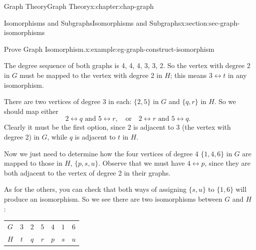 \documentclass[oneside,10pt,]{book}
\newcommand{\tabularfont}{\relax}
\numberwithin{equation}{section}
\newcommand{\hrulemedium}{\noalign{\hrule height 0.07em}}
\begin{document}
\begin{chapterptx}{Graph Theory}{}{Graph Theory}{}{}{x:chapter:chap-graph}
\begin{sectionptx}{Isomorphisms and Subgraphs}{}{Isomorphisms and Subgraphs}{}{}{x:section:sec-graph-isomorphisms}
\begin{example}{Prove Graph Isomorphism.}{x:example:eg-graph-construct-isomorphism}
\begin{sidebyside}{2}{0.22}{0.22}{0.16}
\begin{sbspanel}{0.2}
{
}%
\end{sbspanel}%
\end{sidebyside}%
\par
The degree sequence of both graphs is 4, 4, 4, 3, 3, 2. So the vertex with degree 2 in \(G\) must be mapped to the vertex with degree 2 in \(H\); this means \(3 \leftrightarrow t\) in any isomorphism.%
\par
There are two vertices of degree 3 in each: \(\{2,5\}\) in \(G\) and \(\{q,r\}\) in \(H\). So we should map either%
\begin{equation*}
2 \leftrightarrow q \text{ and } 5 \leftrightarrow r, \quad \text{or} \quad 2 \leftrightarrow r \text{ and } 5 \leftrightarrow q\text{.}
\end{equation*}
Clearly it must be the first option, since \(2\) is adjacent to \(3\) (the vertex with degree 2) in \(G\), while \(q\) is adjacent to \(t\) in \(H\).%
\par
Now we just need to determine how the four vertices of degree 4 \(\{1, 4, 6\}\) in \(G\) are mapped to those in \(H\), \(\{p, s, u\}\). Observe that we must have \(4 \leftrightarrow p\), since they are both adjacent to the vertex of degree 2 in their graphs.%
\par
As for the others, you can check that both ways of assigning \(\{s,u\}\) to \(\{1,6\}\) will produce an isomorphism. So we see there are two isomorphisms between \(G\) and \(H\):%
\begin{sidebyside}{2}{0.05}{0.05}{0.1}%
\begin{sbspanel}{0.4}%
{\centering%
{\tabularfont%
\begin{tabular}{ccccccc}
\(G\)&\(3\)&\(2\)&\(5\)&\(4\)&\(1\)&\(6\)\tabularnewline\hrulemedium
\(H\)&\(t\)&\(q\)&\(r\)&\(p\)&\(s\)&\(u\)
\end{tabular}
}%
\par}
\end{sbspanel}%
\begin{sbspanel}{0.4}%
{\centering%
{\tabularfont%
\begin{tabular}{ccccccc}

\end{tabular}}}
\end{sbspanel}
\end{sidebyside}
\end{example}
\end{sectionptx}
\end{chapterptx}
\end{document}
